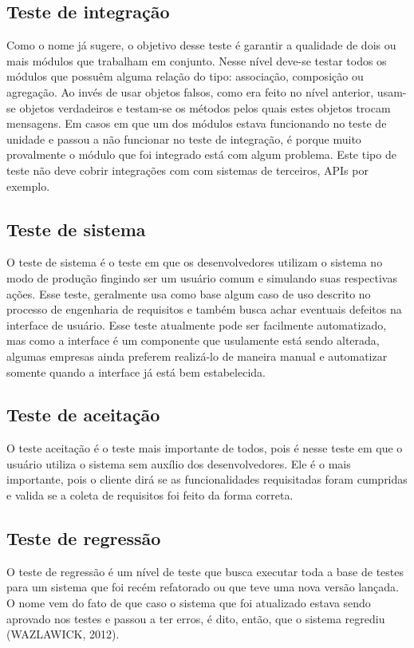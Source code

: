 \documentclass[
    12pt,       %
    openright,      %
    twoside,      %
    a4paper,      %
    english,      %
    french,       %
    spanish,      %
    brazil,       %
    ]{abntex2}
\begin{document}
          \subsection{Teste de integração}
              Como o nome já sugere, o objetivo desse teste é garantir a qualidade de dois ou mais
              módulos que trabalham em conjunto. Nesse nível deve-se testar todos os módulos que possuêm
              alguma relação do tipo: associação, composição ou agregação. Ao invés de usar objetos
              falsos, como era feito no nível anterior, usam-se objetos verdadeiros e testam-se os
              métodos pelos quais estes objetos trocam mensagens. Em casos em que um dos módulos
              estava funcionando no teste de unidade e passou a não funcionar no teste de integração,
              é porque muito provalmente o módulo que foi integrado está com algum problema. Este tipo
              de teste não deve cobrir integrações com com sistemas de terceiros, APIs por exemplo.

          \subsection{Teste de sistema}
              O teste de sistema é o teste em que os desenvolvedores utilizam o sistema no modo de
              produção fingindo ser um usuário comum e simulando suas respectivas ações. Esse teste,
              geralmente usa como base algum caso de uso descrito no processo de engenharia de
              requisitos e também busca achar eventuais defeitos na interface de usuário. Esse
              teste atualmente pode ser facilmente automatizado, mas como a interface é um componente
              que usulamente está sendo alterada, algumas empresas ainda preferem realizá-lo de maneira
              manual e automatizar somente quando a interface já está bem estabelecida.

          \subsection{Teste de aceitação}
              O teste aceitação é o teste mais importante de todos, pois é nesse teste em que o
              usuário utiliza o sistema sem auxílio dos desenvolvedores. Ele é o mais importante,
              pois o cliente dirá se as funcionalidades requisitadas foram cumpridas e valida
              se a coleta de requisitos foi feito da forma correta.

          \subsection{Teste de regressão}
              O teste de regressão é um nível de teste que busca executar toda a base de
              testes para um sistema que foi recém refatorado ou que teve uma nova versão lançada.
              O nome vem do fato de que caso o sistema que foi atualizado estava sendo aprovado
              nos testes e passou a ter erros, é dito, então, que o sistema regrediu (WAZLAWICK, 2012).
\end{document}

